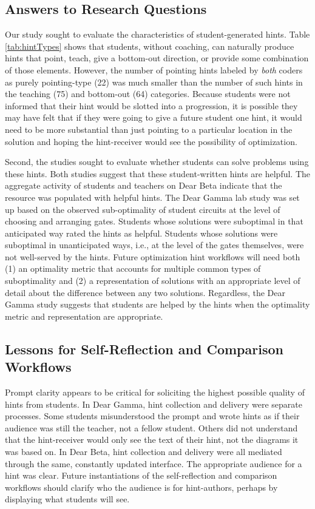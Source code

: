 \subsection{Answers to Research Questions}

Our study sought to evaluate the characteristics of student-generated hints. Table \ref{tab:hintTypes} shows that students, without coaching, can naturally produce hints that point, teach, give a bottom-out direction, or provide some combination of those elements. However, the number of pointing hints labeled by {\it both} coders as purely pointing-type (22) was much smaller than the number of such hints in the teaching (75) and bottom-out (64) categories. Because students were not informed that their hint would be slotted into a progression, it is possible they may have felt that if they were going to give a future student one hint, it would need to be more substantial than just pointing to a particular location in the solution and hoping the hint-receiver would see the possibility of optimization.

Second, the studies sought to evaluate whether students can solve problems using these hints. Both studies suggest that these student-written hints are helpful. The aggregate activity of students and teachers on Dear Beta indicate that the resource was populated with helpful hints. The Dear Gamma lab study was set up based on the observed sub-optimality of student circuits at the level of choosing and arranging gates. Students whose solutions were suboptimal in that anticipated way rated the hints as helpful. Students whose solutions were suboptimal in unanticipated ways, i.e., at the level of the gates themselves, were not well-served by the hints. Future optimization hint workflows will need both (1) an optimality metric that accounts for multiple common types of suboptimality and (2) a representation of solutions with an appropriate level of detail about the difference between any two solutions. Regardless, the Dear Gamma study suggests that students are helped by the hints when the optimality metric and representation are appropriate.

\subsection{Lessons for Self-Reflection and Comparison Workflows}

Prompt clarity appears to be critical for soliciting the highest possible quality of hints from students. In Dear Gamma, hint collection and delivery were separate processes. Some students misunderstood the prompt and wrote hints as if their audience was still the teacher, not a fellow student. Others did not understand that the hint-receiver would only see the text of their hint, not the diagrams it was based on. In Dear Beta, hint collection and delivery were all mediated through the same, constantly updated interface. The appropriate audience for a hint was clear. Future instantiations of the self-reflection and comparison workflows should clarify who the audience is for hint-authors, perhaps by displaying what students will see. 

